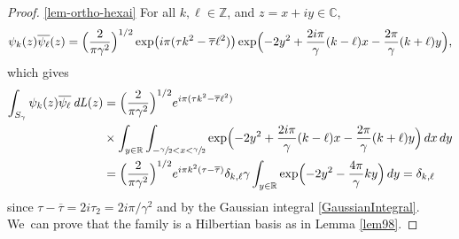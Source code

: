 \documentclass[10pt]{amsart}
\DeclareMathOperator{\dL}{\mathit{dL}}
\theoremstyle{definition}
\let\EE\exp
\let\ov\overline
\newcommand\C{\mathbb C}
\newcommand\R{\mathbb R}
\newcommand\Z{\mathbb Z}
\newcommand{\Bpa}[1]{\Bigl(#1\Bigr)}
\providecommand{\skpt}{\par\smallskip\noindent}
\begin{document}
\skpt
\begin{proof}
\eqref{lem-ortho-hexai} For all $k,\ell \in \Z$, and $z=x+iy \in \C$,
\[
\psi_{k}(z)\ov{\psi_{\ell}}(z)= \Bpa{\frac{2}{\pi \gamma^2}}^{1/2}\EE\bigl({i\pi(\tau k^2-\overline{\tau}\ell^2)}\bigr) \EE\Bigl({-2y^2+\frac{2i\pi}{\gamma}(k-\ell)x-\frac{2\pi}{\gamma}(k+\ell)y}\Bigr),
\]
which gives
\begin{align*}
\int_{S_{\gamma}}\psi_{k}(z)\ov{\psi_{\ell}} \dL(z)
& = \Bpa{\frac{2}{\pi \gamma^2}}^{1/2} e^{i\pi(\tau k^2-\overline{\tau}\ell^2)}\\
&\times\int_{y\in\R}\int_{- \sfrac \gamma 2 < x < \sfrac \gamma 2} \EE\Bigl({-2y^2+\frac{2i\pi}{\gamma}(k-\ell)x-\frac{2\pi}{\gamma}(k+\ell)y}\Bigr)\,dx\, dy \\
&= \Bpa{\frac{2}{\pi \gamma^2}}^{1/2}e^{i\pi k^2(\tau -\overline{\tau})} \delta_{k,\ell} \gamma \int_{y\in\R}\EE\Bigl({-2y^2-\frac{4\pi}{\gamma}ky}\Bigr) \, dy= \delta_{k,\ell}
\end{align*}
since $\tau - \ov{\tau} = 2i \tau_2 = 2i{\pi}/{\gamma^2}$ and by the Gaussian integral \eqref{GaussianIntegral}. We~can prove that the family is a Hilbertian basis as in Lemma \ref{lem98}.


\end{proof}
\end{document}
